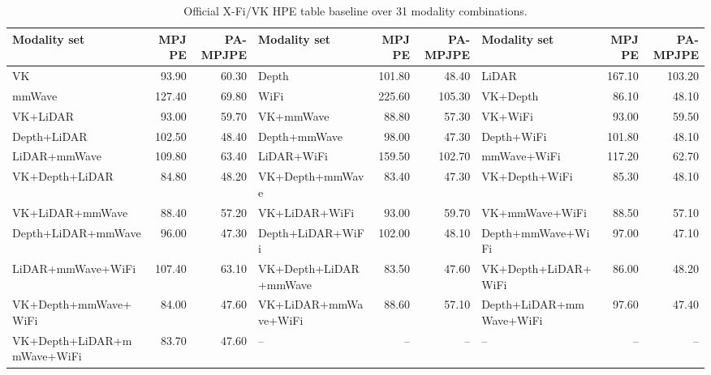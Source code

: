 \documentclass[preprint,12pt]{elsarticle}
\newcommand{\mpjpe}{MPJPE}
\newcommand{\pampjpe}{PA-MPJPE}
\begin{document}
\begin{table}[h]
\centering
\caption{Official X-Fi/VK HPE table baseline over 31 modality combinations.}
\label{tab:ori_hpe_full_combinations}
\scriptsize
\begin{adjustbox}{width=\textwidth}
\begin{tabular}{lrr|lrr|lrr}
\toprule
Modality set & \mpjpe{} & \pampjpe{} & Modality set & \mpjpe{} & \pampjpe{} & Modality set & \mpjpe{} & \pampjpe{} \\
\midrule
VK & 93.90 & 60.30 & Depth & 101.80 & 48.40 & LiDAR & 167.10 & 103.20 \\
mmWave & 127.40 & 69.80 & WiFi & 225.60 & 105.30 & VK+Depth & 86.10 & 48.10 \\
VK+LiDAR & 93.00 & 59.70 & VK+mmWave & 88.80 & 57.30 & VK+WiFi & 93.00 & 59.50 \\
Depth+LiDAR & 102.50 & 48.40 & Depth+mmWave & 98.00 & 47.30 & Depth+WiFi & 101.80 & 48.10 \\
LiDAR+mmWave & 109.80 & 63.40 & LiDAR+WiFi & 159.50 & 102.70 & mmWave+WiFi & 117.20 & 62.70 \\
VK+Depth+LiDAR & 84.80 & 48.20 & VK+Depth+mmWave & 83.40 & 47.30 & VK+Depth+WiFi & 85.30 & 48.10 \\
VK+LiDAR+mmWave & 88.40 & 57.20 & VK+LiDAR+WiFi & 93.00 & 59.70 & VK+mmWave+WiFi & 88.50 & 57.10 \\
Depth+LiDAR+mmWave & 96.00 & 47.30 & Depth+LiDAR+WiFi & 102.00 & 48.10 & Depth+mmWave+WiFi & 97.00 & 47.10 \\
LiDAR+mmWave+WiFi & 107.40 & 63.10 & VK+Depth+LiDAR+mmWave & 83.50 & 47.60 & VK+Depth+LiDAR+WiFi & 86.00 & 48.20 \\
VK+Depth+mmWave+WiFi & 84.00 & 47.60 & VK+LiDAR+mmWave+WiFi & 88.60 & 57.10 & Depth+LiDAR+mmWave+WiFi & 97.60 & 47.40 \\
VK+Depth+LiDAR+mmWave+WiFi & 83.70 & 47.60 & -- & -- & -- & -- & -- & -- \\
\bottomrule
\end{tabular}
\end{adjustbox}
\end{table}
\end{document}
